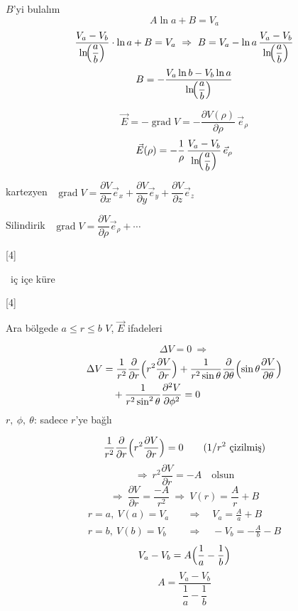 \documentclass[11pt,a4paper]{article}
\begin{document}
$B$'yi bulalım
\[ A\ln a+B=V_a \]
\[ \frac{V_a-V_b}{\ln\!\Bigl(\dfrac{a}{b}\Bigr)}\cdot\ln a+B=V_a \ \Rightarrow\ B=V_a-\ln a\,\frac{V_a-V_b}{\ln\!\Bigl(\dfrac{a}{b}\Bigr)} \]
\[ B=-\frac{V_a\ln b-V_b\ln a}{\ln\!\Bigl(\dfrac{a}{b}\Bigr)} \]


\[ \vec E=-\operatorname{grad}V=-\frac{\partial V(\rho)}{\partial\rho}\,\vec e_\rho \]
\[ \vec E(\rho)=-\frac{1}{\rho}\,\frac{V_a-V_b}{\ln\!\Bigl(\dfrac{a}{b}\Bigr)}\,\vec e_\rho \]

\medskip
\noindent kartezyen \ $\operatorname{grad}V=\dfrac{\partial V}{\partial x}\vec e_x+\dfrac{\partial V}{\partial y}\vec e_y+\dfrac{\partial V}{\partial z}\vec e_z$

\medskip
\noindent Silindirik \ $\operatorname{grad}V=\dfrac{\partial V}{\partial\rho}\vec e_\rho+\cdots$

[4]

 \ iç içe küre

[4]

Ara bölgede $a\le r\le b$ \quad $V$, $\vec E$ ifadeleri

\[ \Delta V=0\ \Rightarrow \]
\begin{align*}
  \Delta V &= \frac{1}{r^2}\frac{\partial}{\partial r}\Bigl(r^2\frac{\partial V}{\partial r}\Bigr)+\frac{1}{r^2\sin\theta}\frac{\partial}{\partial\theta}\Bigl(\sin\theta\frac{\partial V}{\partial\theta}\Bigr) \\
  &\quad+\frac{1}{r^2\sin^2\theta}\frac{\partial^2 V}{\partial\phi^2}=0
\end{align*}
$r,\ \phi,\ \theta$: sadece $r$'ye bağlı

\[ \frac{1}{r^2}\frac{\partial}{\partial r}\Bigl(r^2\frac{\partial V}{\partial r}\Bigr)=0 \qquad \text{($1/r^2$ çizilmiş)} \]
\[ \Rightarrow\ r^2\frac{\partial V}{\partial r}=-A \quad \text{olsun} \]
\[ \Rightarrow\ \frac{\partial V}{\partial r}=\frac{-A}{r^2} \ \Rightarrow\ V(r)=\frac{A}{r}+B \]
\begin{align*}
  r=a,\ V(a)=V_a &\quad\Rightarrow\quad V_a=\frac{A}{a}+B \\
  r=b,\ V(b)=V_b &\quad\Rightarrow\quad -V_b=-\frac{A}{b}-B
\end{align*}
\[ V_a-V_b=A\Bigl(\frac{1}{a}-\frac{1}{b}\Bigr) \]
\[ A=\frac{V_a-V_b}{\dfrac{1}{a}-\dfrac{1}{b}} \]
\end{document}
